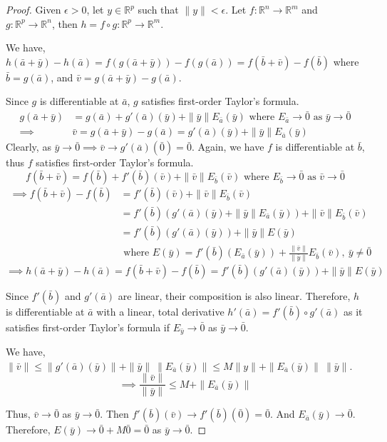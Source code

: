 \begin{proof}
Given $\epsilon > 0$, let $y \in \mathbb{R}^p$ such that $\|y\| < \epsilon$.
Let $f : \mathbb{R}^n \to \mathbb{R}^m$ and $g : \mathbb{R}^p \to \mathbb{R}^n$, then $h = f \circ g : \mathbb{R}^p \to \mathbb{R}^m$.

We have, $h(\bar{a}+\bar{y})-h(\bar{a}) = f(g(\bar{a}+\bar{y})) - f(g(\bar{a})) = f(\bar{b}+\bar{v}) - f(\bar{b})$ where $\bar{b} = g(\bar{a})$, and  $\bar{v} = g(\bar{a}+\bar{y})-g(\bar{a})$.

Since $g$ is differentiable at $\bar{a}$, $g$ satisfies first-order Taylor's formula.
\begin{align*}
	g(\bar{a}+\bar{y}) & =  g(\bar{a}) + g'(\bar{a})(\bar{y}) + \|\bar{y}\| E_{\bar{a}}(\bar{y}) \text{ where } E_{\bar{a}} \to \bar{0} \text{ as } \bar{y} \to \bar{0} \\
	\implies & \bar{v} = g(\bar{a}+\bar{y})-g(\bar{a}) = g'(\bar{a})(\bar{y}) + \|\bar{y}\| E_{\bar{a}}(\bar{y})
\end{align*}
Clearly, as $\bar{y} \to \bar{0} \implies \bar{v} \to g'(\bar{a})(\bar{0}) = \bar{0}$.
Again,  we have $f$ is differentiable at $\bar{b}$, thus $f$ satisfies first-order Taylor's formula.
\[ f(\bar{b}+\bar{v}) = f(\bar{b}) + f'(\bar{b})(\bar{v}) + \|\bar{v}\| E_{\bar{b}}(\bar{v}) \text{ where } E_{\bar{b}} \to \bar{0} \text{ as } \bar{v} \to \bar{0} \]
\begin{align*}
	\implies f(\bar{b}+\bar{v}) - f(\bar{b}) & = f'(\bar{b})(\bar{v}) + \|\bar{v}\| E_{\bar{b}}(\bar{v}) \\
	& = f'(\bar{b})\left( g'(\bar{a})(\bar{y}) + \|\bar{y}\|E_{\bar{a}}(\bar{y}) \right) + \|\bar{v}\| E_{\bar{b}}(\bar{v}) \\
	& = f'(\bar{b})(g'(\bar{a})(\bar{y})) + \|\bar{y}\| E(\bar{y}) \\
	& \text{ where } E(\bar{y}) = f'(\bar{b})(E_{\bar{a}}(\bar{y})) + \frac{\|\bar{v}\|}{\|\bar{y}\|} E_{\bar{b}}(\bar{v}),\ \bar{y} \ne \bar{0}
\end{align*}
\[ \implies h(\bar{a}+\bar{y})-h(\bar{a}) = f(\bar{b}+\bar{v}) - f(\bar{b}) = f'(\bar{b})(g'(\bar{a})(\bar{y})) + \|\bar{y}\|E(\bar{y}) \]

Since $f'(\bar{b})$ and $g'(\bar{a})$ are linear, their composition is also linear.
Therefore, $h$ is differentiable at $\bar{a}$ with a linear, total derivative $h'(\bar{a}) = f'(\bar{b}) \circ g'(\bar{a})$ as it satisfies first-order Taylor's formula if $E_{\bar{y}} \to \bar{0}$ as $\bar{y} \to \bar{0}$.

We have, $\|\bar{v}\| \le \|g'(\bar{a})(\bar{y})\| + \|\bar{y}\|\ \|E_{\bar{a}}(\bar{y})\| \le M\|y\| + \|E_{\bar{a}}(\bar{y})\|\ \|\bar{y}\|$.
\[ \implies \frac{\|\bar{v}\|}{\|\bar{y}\|} \le M + \|E_{\bar{a}}(\bar{y})\| \]

Thus, $\bar{v} \to \bar{0}$ as $\bar{y} \to \bar{0}$.
Then $f'(\bar{b})(\bar{v}) \to f'(\bar{b})(\bar{0}) = \bar{0}$.
And $E_{\bar{a}}(\bar{y}) \to \bar{0}$.
Therefore, $E(\bar{y}) \to \bar{0} + M\bar{0} = \bar{0}$ as $\bar{y} \to \bar{0}$.
\end{proof}

